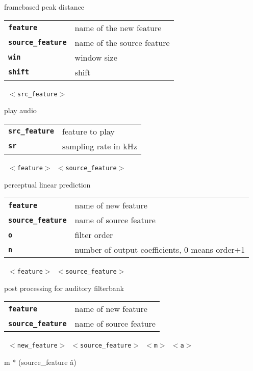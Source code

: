 \begin{description}
\begin{description}
        framebased peak distance

      \begin{tabular}{ll}
 \texttt{\textbf{feature}} &         name of the new feature \\
 \texttt{\textbf{source\_feature}} &  name of the source feature \\
 \texttt{\textbf{win}} &             window size  \\
 \texttt{\textbf{shift}} &            shift  \\
      \end{tabular}
       \texttt{ $<$src\_feature$>$ } \

        play audio

      \begin{tabular}{ll}
 \texttt{\textbf{src\_feature}} &  feature to play \\
 \texttt{\textbf{sr}} &            sampling rate in kHz  \\
      \end{tabular}
       \texttt{ $<$feature$>$ $<$source\_feature$>$  } \

        perceptual linear prediction

      \begin{tabular}{ll}
 \texttt{\textbf{feature}} &         name of new feature \\
 \texttt{\textbf{source\_feature}} &  name of source feature \\
 \texttt{\textbf{o}} &                filter order  \\
 \texttt{\textbf{n}} &                number of output coefficients, 0 means order+1  \\
      \end{tabular}
       \texttt{ $<$feature$>$ $<$source\_feature$>$} \

        post processing for auditory filterbank

      \begin{tabular}{ll}
 \texttt{\textbf{feature}} &         name of new feature \\
 \texttt{\textbf{source\_feature}} &  name of source feature \\
      \end{tabular}
       \texttt{ $<$new\_feature$>$ $<$source\_feature$>$ $<$m$>$ $<$a$>$} \

        m * (source\_feature \^ a)


\end{description}
\end{description}
